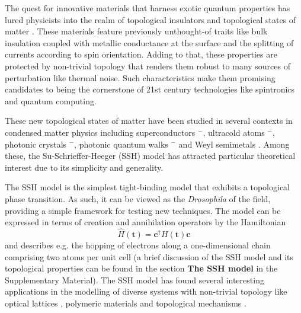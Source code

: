 \documentclass[10pt]{revtex4-1}
\begin{document}
The quest for innovative materials that harness exotic quantum properties has lured physicists into the realm of topological insulators and topological states of matter \cite{RevModPhys.82.3045}. These materials feature previously unthought-of traits like bulk insulation coupled with metallic conductance at the surface and the splitting of currents according to spin orientation. Adding to that, these properties are protected by non-trivial topology that renders them robust to many sources of perturbation like thermal noise. Such characteristics make them promising candidates to being the cornerstone of 21st century technologies like spintronics and quantum computing.

These new topological states of matter have been studied in several contexts in condensed matter physics including superconductors \cite {CONTINENTINO2017A1}$^-$\cite{ryu2010topological}, ultracold atoms \cite{atala2013direct}$^-$\cite{meier2016observation}, photonic crystals \cite{hafezi2013imaging}$^-$\cite{peng2016experimental}, photonic quantum walks \cite{kitagawa2012observation}$^-$\cite{PhysRevX.7.031023} and Weyl semimetals \cite{soluyanov2015type,PhysRevX.5.031013}. Among these, the Su-Schrieffer-Heeger (SSH) model \cite{PhysRevLett.42.1698} has attracted particular theoretical interest due to its simplicity and generality.

The SSH model is the simplest tight-binding model that exhibits a topological phase transition. As such, it can be viewed as the \emph{Drosophila} of the field, providing a simple framework for testing new techniques. The model can be expressed in terms of creation and annihilation operators by the Hamiltonian
\begin{equation}
\label{SSH_ham}
\hat{H}(\mathbf{t})=\mathbf{c}^{\dagger}H(\mathbf{t})\mathbf{c}
\end{equation}
and describes e.g. the hopping of electrons along a one-dimensional chain comprising two atoms per unit cell (a brief discussion of the SSH model and its topological properties can be found in the section \textbf{The SSH model} in the Supplementary Material). The SSH model has found several interesting applications in the modelling of diverse systems with non-trivial topology like optical lattices \cite{maffei2018topological}, polymeric materials \cite{RevModPhys.73.681} and topological mechanisms \cite{kane2014topological,Chen13004}.
\end{document}
